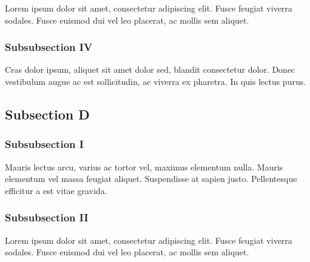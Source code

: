 \par\noindent Lorem ipsum dolor sit amet, consectetur adipiscing elit. Fusce feugiat viverra sodales. Fusce euismod dui vel leo placerat, ac mollis sem aliquet.
\par\subsubsection{Subsubsection IV}
\par\noindent Cras dolor ipsum, aliquet sit amet dolor sed, blandit consectetur dolor. Donec vestibulum augue ac est sollicitudin, ac viverra ex pharetra. In quis lectus purus.
\par\subsection{Subsection D}
\par\subsubsection{Subsubsection I}
\par\noindent Mauris lectus arcu, varius ac tortor vel, maximus elementum nulla. Mauris elementum vel massa feugiat aliquet. Suspendisse at sapien justo. Pellentesque efficitur a est vitae gravida. 
\par\subsubsection{Subsubsection II}
\par\noindent Lorem ipsum dolor sit amet, consectetur adipiscing elit. Fusce feugiat viverra sodales. Fusce euismod dui vel leo placerat, ac mollis sem aliquet.